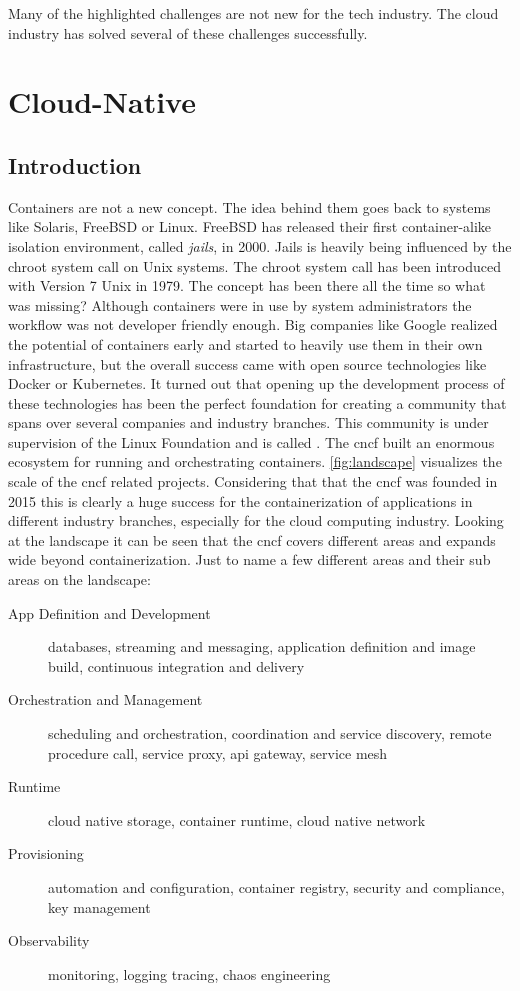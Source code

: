 \documentclass[titlepage]{report}
\begin{document}
Many of the highlighted challenges are not new for the tech industry. The cloud industry has solved several of these challenges successfully.

\chapter{Cloud-Native}
\section{Introduction}
Containers are not a new concept. The idea behind them goes back to systems like Solaris, FreeBSD or Linux. FreeBSD has released their first container-alike
isolation environment, called \emph{jails}, in 2000\cite{FreeBSD4Announcement}. Jails is heavily being influenced by the chroot system call on Unix systems.
The chroot system call has been introduced with Version 7 Unix in 1979\cite{BYTE}. The concept has been there all the time so what was missing?
Although containers were in use by system administrators the workflow was not developer friendly enough. Big companies like Google
realized the potential of containers early and started to heavily use them in their own infrastructure, but the overall success
came with open source technologies like Docker or Kubernetes. It turned out that opening up the development process of these technologies
has been the perfect foundation for creating a community that spans over several companies and industry branches. This community is under
supervision of the Linux Foundation and is called \cite{CNCFFounding}. The \gls{cncf} built an enormous ecosystem for
running and orchestrating containers. \autoref{fig:landscape} visualizes the scale of the \gls{cncf} related projects\cite{CNCFLandscape}. Considering that
that the \gls{cncf} was founded in 2015 this is clearly a huge success for the containerization of applications in different industry branches, especially
for the cloud computing industry. Looking at the landscape it can be seen that the \gls{cncf} covers different areas and expands wide beyond containerization.
Just to name a few different areas and their sub areas on the landscape:

\begin{description}
    \item[App Definition and Development] databases, streaming and messaging, application definition and image build, continuous integration and delivery
    \item[Orchestration and Management] scheduling and orchestration, coordination and service discovery, remote procedure call, service proxy, api gateway, service mesh
    \item[Runtime] cloud native storage, container runtime, cloud native network
    \item[Provisioning] automation and configuration, container registry, security and compliance, key management
    \item[Observability] monitoring, logging tracing, chaos engineering
\end{description}
\end{document}

